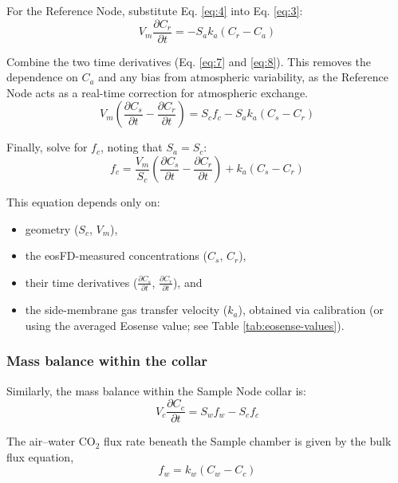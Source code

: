 \documentclass[11pt]{article}
\begin{document}
For the Reference Node, substitute Eq. \ref{eq:4} into Eq. \ref{eq:3}:
\begin{equation} \label{eq:8}
	V_m \frac{\partial C_r}{\partial t} = -S_a k_a (C_r - C_a)
\end{equation}

Combine the two time derivatives (Eq. \ref{eq:7} and \ref{eq:8}). This removes the dependence on $C_a$ and any bias from atmospheric variability, as the Reference Node acts as a real-time correction for atmospheric exchange.
\begin{equation} \label{eq:9}
	V_m \left(\frac{\partial C_s}{\partial t} - \frac{\partial C_r}{\partial t}\right) = S_c f_c - S_a k_a (C_s - C_r) 
\end{equation}

Finally, solve for $f_c$, noting that $S_a = S_c$:
\begin{equation} \label{eq:10}
	\boxed{f_c = \frac{V_m}{S_c} \left( \frac{\partial C_s}{\partial t} - \frac{\partial C_r}{\partial t} \right) + k_a (C_s - C_r)}
\end{equation}

This equation depends only on:
\begin{itemize}
	\item geometry ($S_c$, $V_m$),
	\item the eosFD-measured concentrations ($C_s$, $C_r$),
	\item their time derivatives ($\frac{\partial C_s}{\partial t}$, $\frac{\partial C_r}{\partial t}$), and
	\item the side-membrane gas transfer velocity ($k_a$), obtained via calibration (or using the averaged Eosense value; see Table \ref{tab:eosense-values}).
\end{itemize}

\subsubsection{Mass balance within the collar}

Similarly, the mass balance within the Sample Node collar is:
\begin{equation} \label{eq:11}
	V_c \frac{\partial C_c}{\partial t} = S_w f_w - S_c f_c
\end{equation}

The air--water CO$_2$ flux rate beneath the Sample chamber is given by the bulk flux equation,
\begin{equation} \label{eq:12}
	f_w = k_w(C_w - C_c)
\end{equation}
\end{document}
